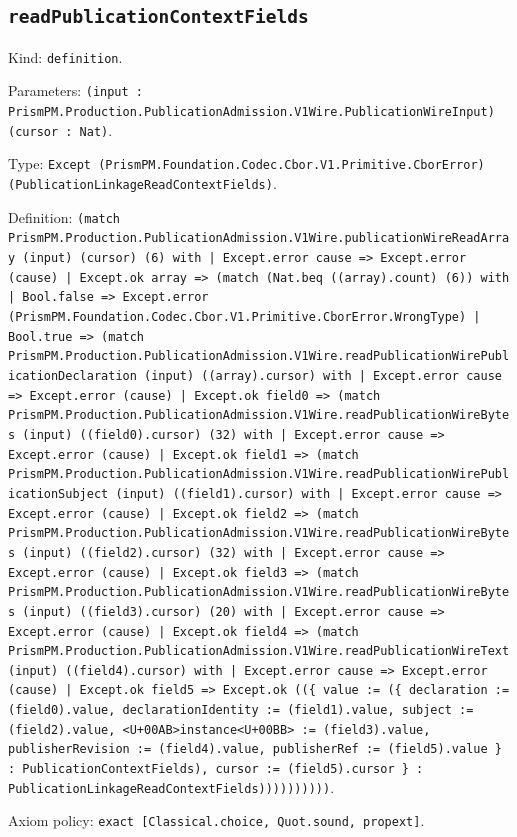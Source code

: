 \documentclass[11pt]{article}
\begin{document}
\subsection*{\texttt{readPublicationContextFields}}
\noindent Kind: \texttt{definition}.\par
\noindent Parameters: \texttt{(input : PrismPM.Production.PublicationAdmission.V1Wire.PublicationWireInput) (cursor : Nat)}.\par
\noindent Type: \texttt{Except (PrismPM.Foundation.Codec.Cbor.V1.Primitive.CborError) (PublicationLinkageReadContextFields)}.\par
\noindent Definition: \texttt{(match PrismPM.Production.PublicationAdmission.V1Wire.publicationWireReadArray (input) (cursor) (6) with | Except.error cause => Except.error (cause) | Except.ok array => (match (Nat.beq ((array).count) (6)) with | Bool.false => Except.error (PrismPM.Foundation.Codec.Cbor.V1.Primitive.CborError.WrongType) | Bool.true => (match PrismPM.Production.PublicationAdmission.V1Wire.readPublicationWirePublicationDeclaration (input) ((array).cursor) with | Except.error cause => Except.error (cause) | Except.ok field0 => (match PrismPM.Production.PublicationAdmission.V1Wire.readPublicationWireBytes (input) ((field0).cursor) (32) with | Except.error cause => Except.error (cause) | Except.ok field1 => (match PrismPM.Production.PublicationAdmission.V1Wire.readPublicationWirePublicationSubject (input) ((field1).cursor) with | Except.error cause => Except.error (cause) | Except.ok field2 => (match PrismPM.Production.PublicationAdmission.V1Wire.readPublicationWireBytes (input) ((field2).cursor) (32) with | Except.error cause => Except.error (cause) | Except.ok field3 => (match PrismPM.Production.PublicationAdmission.V1Wire.readPublicationWireBytes (input) ((field3).cursor) (20) with | Except.error cause => Except.error (cause) | Except.ok field4 => (match PrismPM.Production.PublicationAdmission.V1Wire.readPublicationWireText (input) ((field4).cursor) with | Except.error cause => Except.error (cause) | Except.ok field5 => Except.ok ((\{ value := (\{ declaration := (field0).value, declarationIdentity := (field1).value, subject := (field2).value, <U+00AB>instance<U+00BB> := (field3).value, publisherRevision := (field4).value, publisherRef := (field5).value \} : PublicationContextFields), cursor := (field5).cursor \} : PublicationLinkageReadContextFields))))))))))}.\par
\noindent Axiom policy: \texttt{exact [Classical.choice, Quot.sound, propext]}.\par
\end{document}
